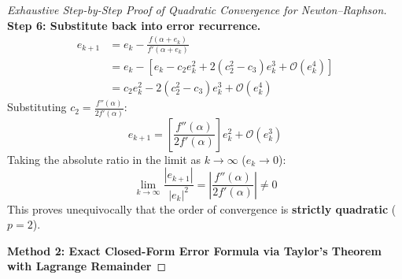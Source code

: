 \begin{proof}[Exhaustive Step-by-Step Proof of Quadratic Convergence for Newton--Raphson]
\noindent\textbf{Step 6: Substitute back into error recurrence.} \\
\begin{align}
    e_{k+1} &= e_k - \frac{f(\alpha + e_k)}{f'(\alpha + e_k)} \nonumber \\
    &= e_k - \left[ e_k - c_2 e_k^2 + 2(c_2^2 - c_3) e_k^3 + \mathcal{O}(e_k^4) \right] \nonumber \\
    &= c_2 e_k^2 - 2(c_2^2 - c_3) e_k^3 + \mathcal{O}(e_k^4)
\end{align}
Substituting $c_2 = \frac{f''(\alpha)}{2 f'(\alpha)}$:
\begin{equation}
    \boxed{e_{k+1} = \left[ \frac{f''(\alpha)}{2 f'(\alpha)} \right] e_k^2 + \mathcal{O}(e_k^3)}
\end{equation}
Taking the absolute ratio in the limit as $k \to \infty$ ($e_k \to 0$):
\begin{equation}
    \lim_{k \to \infty} \frac{|e_{k+1}|}{|e_k|^2} = \left| \frac{f''(\alpha)}{2 f'(\alpha)} \right| \ne 0
\end{equation}
This proves unequivocally that the order of convergence is \textbf{strictly quadratic} ($p = 2$).

\bigskip
\noindent\textbf{Method 2: Exact Closed-Form Error Formula via Taylor's Theorem with Lagrange Remainder}


\end{proof}
